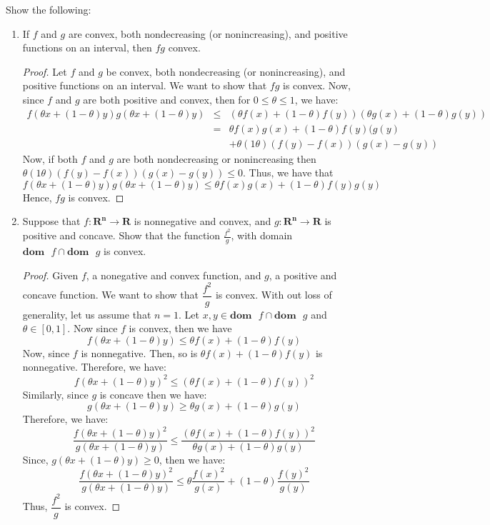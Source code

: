 \begin{prob}[2.4]Show the following:
\end{prob}  
  \begin{enumerate}[label=(\alph*)]
  \item{If $f$ and $g$ are convex, both nondecreasing (or nonincreasing), and positive functions on an interval, then $fg$ convex.
    \begin{proof}
      Let $f$ and $g$ be convex, both nondecreasing (or nonincreasing), and positive functions on an interval. We want to show that $fg$ is convex. Now, since $f$ and $g$ are both positive and convex, then for $0 \leq \theta \leq 1$, we have:
      \begin{eqnarray*}
        f( \theta x + (1 - \theta)y)g(\theta x + (1- \theta)y) & \leq & (\theta f(x) + (1 - \theta)f(y))(\theta g(x) + (1 - \theta)g(y))\\
        & = & \theta f(x)g(x) + (1 - \theta)f(y)(g(y)\\
        && + \theta(1 \theta)(f(y) - f(x))(g(x) - g(y))
      \end{eqnarray*}
      Now, if both $f$ and $g$ are both nondecreasing or nonincreasing then $\theta(1 \theta)(f(y) - f(x))(g(x) - g(y)) \leq 0$.  Thus, we have that
      \[
      f(\theta x + (1 - \theta)y)g(\theta x + (1- \theta)y)  \leq \theta f(x)g(x) + (1 - \theta)f(y)g(y)
      \]
      Hence, $fg$ is convex.
    \end{proof}}
  \item{Suppose that $f: \mathbf{R^{n}} \rightarrow \mathbf{R}$ is nonnegative and convex, and $g: \mathbf{R^{n}} \rightarrow \mathbf{R}$ is positive and concave. Show that the function $\frac{f^{2}}{g}$, with domain $\mathbf{dom} \mbox{ }f \cap \mathbf{dom} \mbox{ }g$ is convex.
    \begin{proof}
      Given $f$, a nonegative and convex function, and $g$, a positive and concave function. We want to show that $\dfrac{f^{2}}{g}$ is convex.  With out loss of generality, let us assume that $n =1$. Let $x,y \in \mathbf{dom} \mbox{ } f \cap \mathbf{dom} \mbox{ } g$ and $\theta \in [0,1]$. Now since $f$ is convex, then we have
      \[
      f(\theta x + (1 - \theta)y) \leq \theta f(x) + (1 - \theta)f(y)
      \]
      Now, since $f$ is nonnegative. Then, so is $\theta f(x) + (1 - \theta)f(y)$ is nonnegative. Therefore, we have:
      \[
      f(\theta x + (1 - \theta)y)^{2} \leq (\theta f(x) + (1 - \theta)f(y))^{2}
      \]
      Similarly, since $g$ is concave then we have:
      \[
      g(\theta x + (1 - \theta)y) \geq \theta g(x) + (1 - \theta)g(y)
      \]
      Therefore, we have:
      \[
      \dfrac{f(\theta x + (1 - \theta)y)^{2}}{g(\theta x + (1 - \theta)y)} \leq \dfrac{(\theta f(x) + (1 - \theta)f(y))^{2}}{\theta g(x) + (1 - \theta)g(y)}
      \]
      Since, $g(\theta x + (1 - \theta)y) \geq 0$, then we have:
      \[
      \dfrac{f(\theta x + (1 - \theta)y)^{2}}{g(\theta x + (1 - \theta)y)} \leq \theta \dfrac{f(x)^{2}}{g(x)} + (1 - \theta)\dfrac{f(y)^{2}}{g(y)}
      \]
      Thus, $\dfrac{f^{2}}{g}$ is convex.
    \end{proof}}    
  \end{enumerate}
